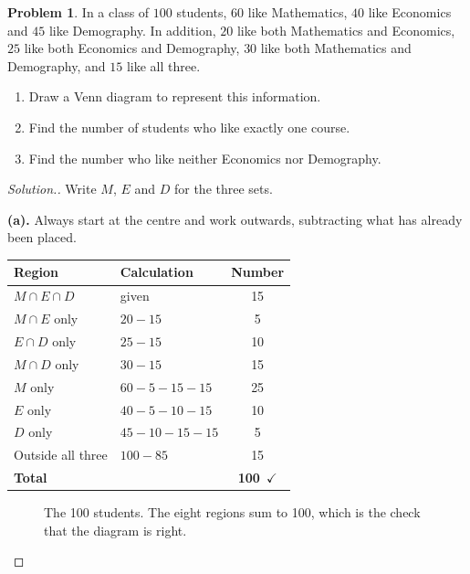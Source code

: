 \documentclass[11pt,a4paper]{article}
\theoremstyle{definition}
\newtheorem{problemx}{Problem}[section]
\newenvironment{problem}{\begin{problemx}}{\end{problemx}}
\newenvironment{solution}
  {\renewcommand{\qedsymbol}{}\begin{proof}[\textit{Solution}.]}
  {\end{proof}}
\let\amscheckmark\checkmark
\renewcommand{\checkmark}{\ensuremath{\amscheckmark}}
\begin{document}
\begin{problem}
In a class of $100$ students, $60$ like Mathematics, $40$ like Economics and $45$ like
Demography. In addition, $20$ like both Mathematics and Economics, $25$ like both
Economics and Demography, $30$ like both Mathematics and Demography, and $15$ like all
three.
\begin{enumerate}
\item[(a).] Draw a Venn diagram to represent this information.
\item[(b).] Find the number of students who like exactly one course.
\item[(c).] Find the number who like neither Economics nor Demography.
\end{enumerate}
\end{problem}

\begin{solution}
Write $M$, $E$ and $D$ for the three sets.

\textbf{(a).} Always start at the centre and work outwards, subtracting what has already
been placed.

\begin{table}[H]
\centering
\begin{tabular}{|l|l|c|}
\hline
Region & Calculation & Number\\
\hline
$M\cap E\cap D$ & given & 15\\
$M\cap E$ only & $20-15$ & 5\\
$E\cap D$ only & $25-15$ & 10\\
$M\cap D$ only & $30-15$ & 15\\
$M$ only & $60-5-15-15$ & 25\\
$E$ only & $40-5-10-15$ & 10\\
$D$ only & $45-10-15-15$ & 5\\
Outside all three & $100-85$ & 15\\
\hline
\textbf{Total} & & \textbf{100}\ \checkmark\\
\hline
\end{tabular}
\end{table}

\begin{figure}[H]
\centering
{}
\caption{The 100 students. The eight regions sum to 100, which is the check that the diagram is right.}
\end{figure}


\end{solution}
\end{document}
